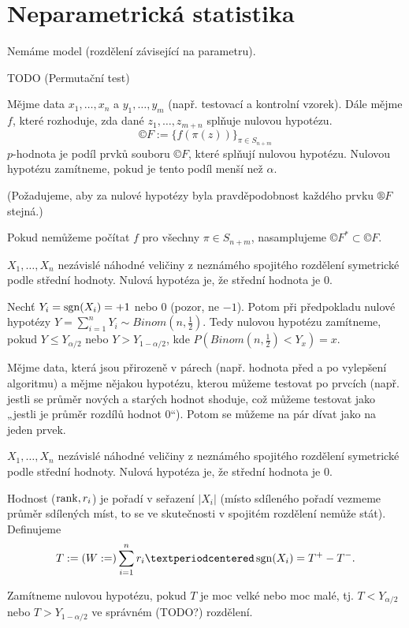 \documentclass[12pt]{article}					%
\begin{document}
\section{Neparametrická statistika}
\begin{definice}
	Nemáme model (rozdělení závisející na parametru).
\end{definice}

TODO (Permutační test) %

\begin{definice}
	Mějme data $x_1, …, x_n$ a $y_1, …, y_m$ (např. testovací a kontrolní vzorek). Dále mějme $f$, které rozhoduje, zda dané $z_1, …, z_{m+n}$ splňuje nulovou hypotézu.
	$$ ©F := \{f(\pi(z))\}_{\pi \in S_{n + m}} $$
	$p$-hodnota je podíl prvků souboru $©F$, které splňují nulovou hypotézu. Nulovou hypotézu zamítneme, pokud je tento podíl menší než $\alpha$.

	(Požadujeme, aby za nulové hypotézy byla pravděpodobnost každého prvku $®F$ stejná.)
\end{definice}

\begin{definice}
	Pokud nemůžeme počítat $f$ pro všechny $\pi \in S_{n+m}$, nasamplujeme $©F^* \subset ©F$.
\end{definice}

\begin{definice}
	$X_1, …, X_n$ nezávislé náhodné veličiny z neznámého spojitého rozdělení symetrické podle střední hodnoty. Nulová hypotéza je, že střední hodnota je 0.

	Nechť $Y_i = \operatorname{sgn}(X_i) = +1$ nebo $0$ (pozor, ne $-1$). Potom při předpokladu nulové hypotézy $Y = \sum_{i=1}^n Y_i \sim Binom(n, \frac{1}{2})$. Tedy nulovou hypotézu zamítneme, pokud $Y ≤ Y_{\alpha / 2}$ nebo $Y > Y_{1 - \alpha / 2}$, kde $P(Binom(n, \frac{1}{2}) < Y_x) = x$.
\end{definice}

\begin{definice}
	Mějme data, která jsou přirozeně v párech (např. hodnota před a po vylepšení algoritmu) a mějme nějakou hypotézu, kterou můžeme testovat po prvcích (např. jestli se průměr nových a starých hodnot shoduje, což můžeme testovat jako „jestli je průměr rozdílů hodnot 0“). Potom se můžeme na pár dívat jako na jeden prvek.
\end{definice}

\begin{definice}
	$X_1, …, X_n$ nezávislé náhodné veličiny z neznámého spojitého rozdělení symetrické podle střední hodnoty. Nulová hypotéza je, že střední hodnota je 0.
	
	Hodnost ($\operatorname{rank}, r_i$) je pořadí v seřazení $|X_i|$ (místo sdíleného pořadí vezmeme průměr sdílených míst, to se ve skutečnosti v spojitém rozdělení nemůže stát). Definujeme
	$$ T := (W := ) \sum_{i=1}^n r_i·\sgn(X_i) = T^+ - T^-. $$

	Zamítneme nulovou hypotézu, pokud $T$ je moc velké nebo moc malé, tj. $T < Y_{\alpha / 2}$ nebo $T > Y_{1 - \alpha / 2}$ ve správném (TODO?) rozdělení.
\end{definice}
\end{document}

